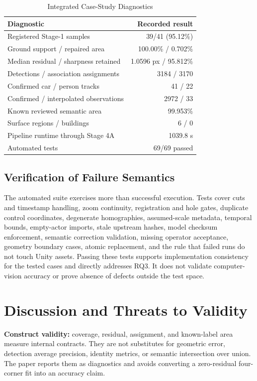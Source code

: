 \documentclass[letterpaper,conference]{IEEEtran}
\begin{document}
\begin{table}[t]
\caption{Integrated Case-Study Diagnostics}
\label{tab:case}
\centering
\footnotesize
\begin{tabular}{@{}lr@{}}
\toprule
Diagnostic & Recorded result \\
\midrule
Registered Stage-1 samples & 39/41 (95.12\%) \\
Ground support / repaired area & 100.00\% / 0.702\% \\
Median residual / sharpness retained & 1.0596 px / 95.812\% \\
Detections / association assignments & 3184 / 3170 \\
Confirmed car / person tracks & 41 / 22 \\
Confirmed / interpolated observations & 2972 / 33 \\
Known reviewed semantic area & 99.953\% \\
Surface regions / buildings & 6 / 0 \\
Pipeline runtime through Stage 4A & 1039.8 s \\
Automated tests & 69/69 passed \\
\bottomrule
\end{tabular}
\end{table}

\subsection{Verification of Failure Semantics}
The automated suite exercises more than successful execution. Tests cover cuts and timestamp handling, zoom continuity, registration and hole gates, duplicate control coordinates, degenerate homographies, assumed-scale metadata, temporal bounds, empty-actor imports, stale upstream hashes, model checksum enforcement, semantic correction validation, missing operator acceptance, geometry boundary cases, atomic replacement, and the rule that failed runs do not touch Unity assets. Passing these tests supports implementation consistency for the tested cases and directly addresses RQ3. It does not validate computer-vision accuracy or prove absence of defects outside the test space.

\section{Discussion and Threats to Validity}
\textbf{Construct validity:} coverage, residual, assignment, and known-label area measure internal contracts. They are not substitutes for geometric error, detection average precision, identity metrics, or semantic intersection over union. The paper reports them as diagnostics and avoids converting a zero-residual four-corner fit into an accuracy claim.
\end{document}
